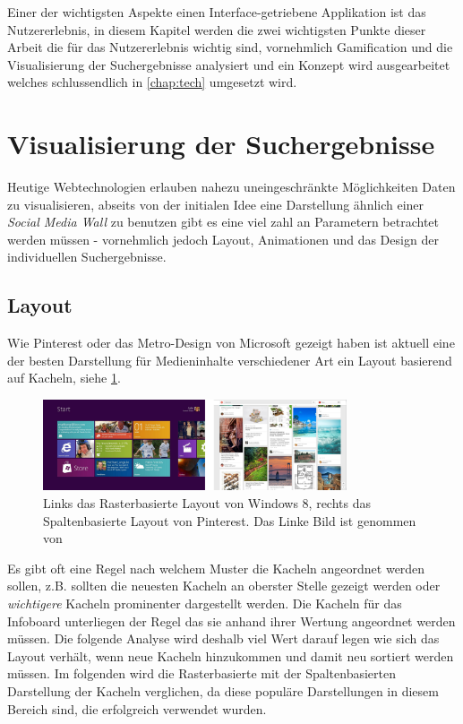 \documentclass[12pt,twoside]{book}
\begin{document}
Einer der wichtigsten Aspekte einen Interface-getriebene Applikation ist das Nutzererlebnis, in diesem Kapitel werden die zwei wichtigsten Punkte dieser Arbeit die für das Nutzererlebnis wichtig sind, vornehmlich Gamification und die Visualisierung der Suchergebnisse analysiert und ein Konzept wird ausgearbeitet welches schlussendlich in \ref{chap:tech} umgesetzt wird.

\section{Visualisierung der Suchergebnisse}\label{chap:concept:wall}

Heutige Webtechnologien erlauben nahezu uneingeschränkte Möglichkeiten Daten zu visualisieren, abseits von der initialen Idee eine Darstellung ähnlich einer \textit{Social Media Wall} zu benutzen gibt es eine viel zahl an Parametern betrachtet werden müssen - vornehmlich jedoch Layout, Animationen und das Design der individuellen Suchergebnisse.

\subsection{Layout}

Wie Pinterest\cite{pinterest} oder das Metro-Design von Microsoft gezeigt haben ist aktuell eine der besten Darstellung für Medieninhalte verschiedener Art ein Layout basierend auf Kacheln, siehe \ref{fig:metro_pinterest}.

\begin{figure}[H]
    \centering
    \includegraphics[width=0.8\textwidth]{images/metro_pinterest.png}
    \caption{Links das Rasterbasierte Layout von Windows 8, rechts das Spaltenbasierte Layout von Pinterest. Das Linke Bild ist genommen von \cite{metrodesign}}
    \label{fig:metro_pinterest}
  \end{figure}

Es gibt oft eine Regel nach welchem Muster die Kacheln angeordnet werden sollen, z.B. sollten die neuesten Kacheln an oberster Stelle gezeigt werden oder \textit{wichtigere} Kacheln prominenter dargestellt werden. Die Kacheln für das Infoboard unterliegen der Regel das sie anhand ihrer Wertung angeordnet werden müssen. Die folgende Analyse wird deshalb viel Wert darauf legen wie sich das Layout verhält, wenn neue Kacheln hinzukommen und damit neu sortiert werden müssen.
Im folgenden wird die Rasterbasierte mit der Spaltenbasierten Darstellung der Kacheln verglichen, da diese populäre Darstellungen in diesem Bereich sind, die erfolgreich verwendet wurden.
\end{document}

